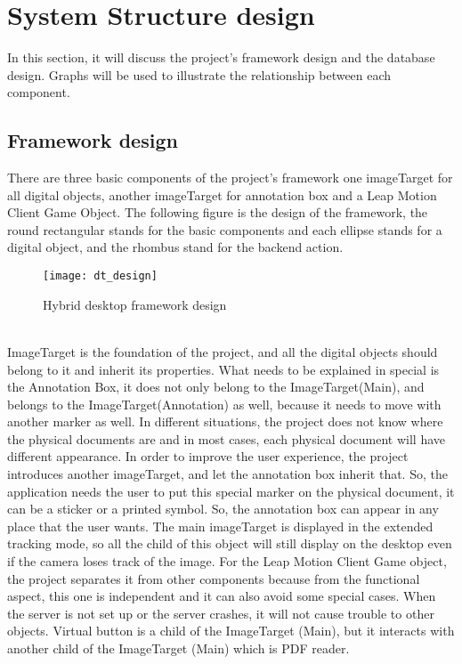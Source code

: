 \section{System Structure design}
In this section, it will discuss the project’s framework design and the database design. Graphs will be used to illustrate the relationship between each component. 
\subsection{Framework design}
There are three basic components of the project’s framework one imageTarget for all digital objects, another imageTarget for annotation box and a Leap Motion Client Game Object. The following figure is the design of the framework, the round rectangular stands for the basic components and each ellipse stands for a digital object, and the rhombus stand for the backend action.
\\
\begin{figure}[h]
    \centering
	\texttt{[image: dt\_design]}
    \caption{Hybrid desktop framework design}
    \label{fig:mesh1}
\end{figure}
\\
ImageTarget is the foundation of the project, and all the digital objects should belong to it and inherit its properties. What needs to be explained in special is the Annotation Box, it does not only belong to the ImageTarget(Main), and belongs to the ImageTarget(Annotation) as well, because it needs to move with another marker as well. In different situations, the project does not know where the physical documents are and in most cases, each physical document will have different appearance. In order to improve the user experience, the project introduces another imageTarget, and let the annotation box inherit that. So, the application needs the user to put this special marker on the physical document, it can be a sticker or a printed symbol. So, the annotation box can appear in any place that the user wants. The main imageTarget is displayed in the extended tracking mode, so all the child of this object will still display on the desktop even if the camera loses track of the image. For the Leap Motion Client Game object, the project separates it from other components because from the functional aspect, this one is independent and it can also avoid some special cases. When the server is not set up or the server crashes, it will not cause trouble to other objects. Virtual button is a child of the ImageTarget (Main), but it interacts with another child of the ImageTarget (Main) which is PDF reader.
